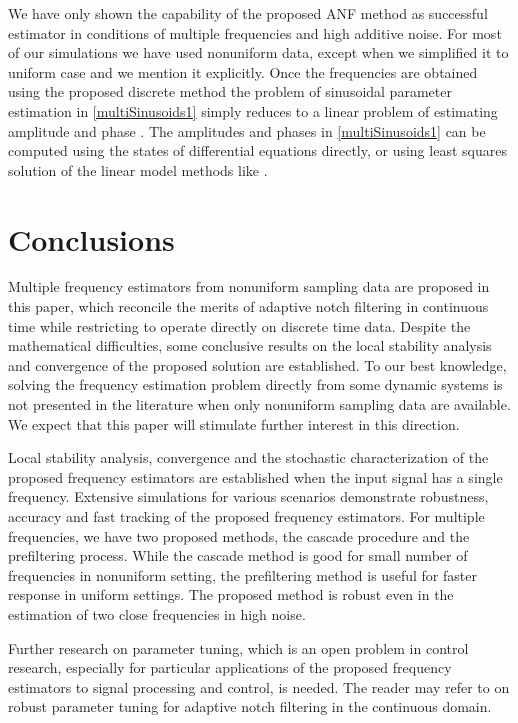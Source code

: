 \documentclass{UCF_ETD}
\begin{document}
We have only shown the capability of the proposed ANF method as successful estimator in conditions of multiple frequencies and high additive noise. For most of our simulations we have used nonuniform data, except when we simplified it to uniform case and we mention it explicitly. Once the frequencies are obtained using the proposed discrete method the problem of sinusoidal parameter estimation in \eqref{multiSinusoids1} simply reduces to a linear problem of estimating amplitude and phase \cite{abbas13}. The amplitudes and phases in \eqref{multiSinusoids1} can be computed using the states of differential equations directly, or using least squares solution of the linear model methods like \cite{abbas13}.



\section{Conclusions}\label{sec:conclusion}

Multiple frequency estimators from  nonuniform sampling data
  are proposed in this paper,
  which reconcile the merits of adaptive notch filtering in continuous time while restricting to operate directly on discrete time data. %
  Despite the mathematical difficulties, some conclusive results on the local stability analysis and convergence of the proposed solution are established.
  To our best knowledge, solving the frequency estimation problem directly
  from some dynamic systems is not presented in the literature
  when only nonuniform sampling data are available. We expect that this paper will stimulate further interest in this direction.


Local stability analysis, convergence and the stochastic characterization of the proposed frequency estimators are established when
the input signal has a single frequency. Extensive simulations for various scenarios
demonstrate robustness, accuracy and fast tracking of the proposed  frequency estimators.  For multiple frequencies, we have two proposed methods, the cascade procedure and the prefiltering process. While the cascade method is good for small number of frequencies in nonuniform setting, the prefiltering method is useful for faster response in uniform settings. The proposed method is robust even in the estimation of two close frequencies in high noise.


Further research on  parameter tuning, which is an open problem in control research, especially for
particular applications of the proposed frequency estimators to signal processing and control,
is needed.
 The reader may refer to
\cite{hsuortegadamm99,  marino02, xia02, mojiri04,   hou05, mojiri07, mojiri07b}
on robust parameter tuning for adaptive notch filtering in the continuous domain.
\end{document}
